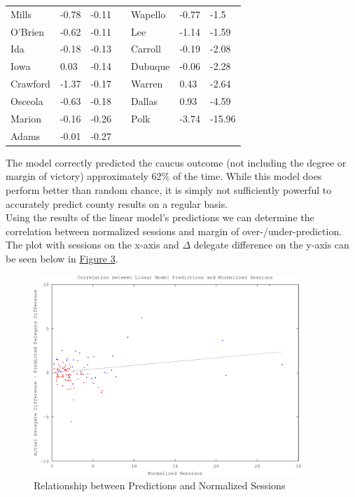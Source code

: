 \documentclass[11pt]{article}
\begin{document}
\begin{table}[H]
\begin{tabular}{lllllll}
Mills         & -0.78     & -0.11  &  & Wapello    & -0.77     & -1.5   \\
O'Brien       & -0.62     & -0.11  &  & Lee        & -1.14     & -1.59  \\
Ida           & -0.18     & -0.13  &  & Carroll    & -0.19     & -2.08  \\
Iowa          & 0.03      & -0.14  &  & Dubuque    & -0.06     & -2.28  \\
Crawford      & -1.37     & -0.17  &  & Warren     & 0.43      & -2.64  \\
Osceola       & -0.63     & -0.18  &  & Dallas     & 0.93      & -4.59  \\
Marion        & -0.16     & -0.26  &  & Polk       & -3.74     & -15.96 \\
Adams         & -0.01     & -0.27  &  &            &           &       
\end{tabular}
\end{table}

\begin{multicols}{2}

The model correctly predicted the caucus outcome (not including the degree or margin of victory) approximately 62\% of the time. While this model does perform better than random chance, it is simply not sufficiently powerful to accurately predict county results on a regular basis. \\

Using the results of the linear model's predictions we can determine the correlation between normalized sessions and margin of over-/under-prediction. The plot with sessions on the x-axis and $\Delta$ delegate difference on the y-axis can be seen below in \underline{Figure 3}.\\

\end{multicols}

\begin{figure}[H]
    \caption{Relationship between Predictions and Normalized Sessions}
    \centering
    \includegraphics[width=0.9\textwidth]{iowa-corr-predictions-crop}
\end{figure}
 
\end{document}
